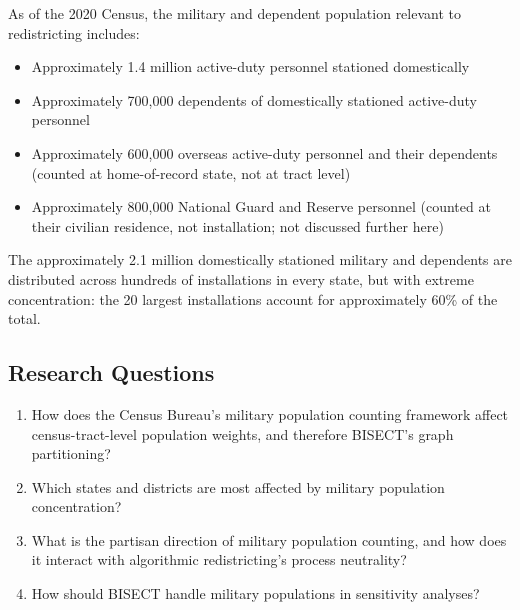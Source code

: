 As of the 2020 Census, the military and dependent population relevant to redistricting includes:
\begin{itemize}
    \item Approximately 1.4 million active-duty personnel stationed domestically
    \item Approximately 700,000 dependents of domestically stationed active-duty personnel
    \item Approximately 600,000 overseas active-duty personnel and their dependents (counted at home-of-record state, not at tract level)
    \item Approximately 800,000 National Guard and Reserve personnel (counted at their civilian residence, not installation; not discussed further here)
\end{itemize}

The approximately 2.1 million domestically stationed military and dependents are distributed across hundreds of installations in every state, but with extreme concentration: the 20 largest installations account for approximately 60\% of the total.

\subsection{Research Questions}

\begin{enumerate}
    \item How does the Census Bureau's military population counting framework affect census-tract-level population weights, and therefore BISECT's graph partitioning?
    \item Which states and districts are most affected by military population concentration?
    \item What is the partisan direction of military population counting, and how does it interact with algorithmic redistricting's process neutrality?
    \item How should BISECT handle military populations in sensitivity analyses?
\end{enumerate}
